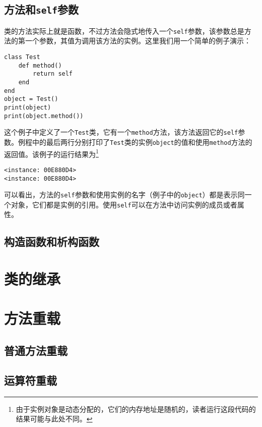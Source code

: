 \subsection{方法和\texttt{self}参数}

类的方法实际上就是函数，不过方法会隐式地传入一个\texttt{self}参数，该参数总是方法的第一个参数，其值为调用该方法的实例。这里我们用一个简单的例子演示：
\begin{lstlisting}[language=berry, numbers=none]
class Test
    def method()
        return self
    end
end
object = Test()
print(object)
print(object.method())
\end{lstlisting}
这个例子中定义了一个\texttt{Test}类，它有一个\texttt{method}方法，该方法返回它的\texttt{self}参数。例程中的最后两行分别打印了\texttt{Test}类的实例\texttt{object}的值和使用\texttt{method}方法的返回值。该例子的运行结果为\footnote{由于实例对象是动态分配的，它们的内存地址是随机的，读者运行这段代码的结果可能与此处不同。}
\begin{lstlisting}[numbers=none]
<instance: 00E880D4>
<instance: 00E880D4>
\end{lstlisting}
可以看出，方法的\texttt{self}参数和使用实例的名字（例子中的\texttt{object}）都是表示同一个对象，它们都是实例的引用。使用\texttt{self}可以在方法中访问实例的成员或者属性。

\subsection{构造函数和析构函数}

\section{类的继承}

\section{方法重载}

\subsection{普通方法重载}

\subsection{运算符重载}
